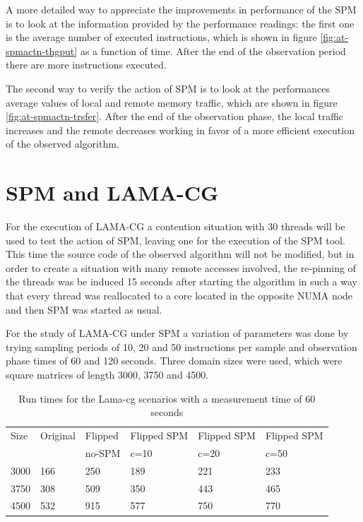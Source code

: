 A more detailed way to appreciate the improvements in performance of the SPM is to look at the information provided by the performance readings: the first one is the average number of executed instructions, which is shown in figure \ref{fig:at-spmactn-thgput} as a function of time. After the end of the observation period there are more instructions executed. 

The second way to verify the action of SPM is to look at the performances average values of local and remote memory traffic, which are shown in figure \ref{fig:at-spmactn-trsfer}. After the end of the observation phase, the local traffic increases and the remote decreases working in favor of a more efficient execution of the observed algorithm.

\section{SPM and LAMA-CG}\label{section:spmylamacg}

For the execution of LAMA-CG a contention situation with 30 threads will be used to test the action of SPM, leaving one for the execution of the SPM tool. This time the source code of the observed algorithm will not be modified, but in order to create a situation with many remote accesses involved, the re-pinning of the threads was be induced 15 seconds after starting the algorithm in such a way that every thread was reallocated to a core located in the opposite NUMA node and then SPM was started as usual.

For the study of LAMA-CG under SPM a variation of parameters was done by trying sampling periods of 10, 20 and 50 instructions per sample and observation phase times of 60 and 120 seconds. Three domain sizes were used, which were square matrices of length 3000, 3750 and 4500.


\begin{table}
	\centering
		\begin{tabularx}{\textwidth}{|l|l|l|l|l|X|}
		\hline
			Size & Original & Flipped & Flipped SPM & Flipped SPM  & Flipped SPM \\
			 &  &  no-SPM & c=10  &c=20 &c=50\\
			\hline
			3000 & 166 & 250 & 189 & 221 & 233\\
			\hline
			3750 & 308 & 509 & 350 & 443 & 465\\
			\hline
			4500 & 532 & 915 & 577 & 750 & 770\\
			\hline
		\end{tabularx}
		\caption{Run times for the Lama-cg scenarios with a measurement time of 60 seconds}
		\label{table:lamatim60}
\end{table}

